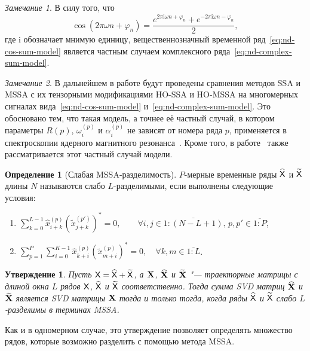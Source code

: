 \documentclass[specialist,
  substylefile=spbu_report.rtx,
subf,href,colorlinks=true, 12pt]{disser}
\theoremstyle{plain}
\newtheorem{statement}{Утверждение}[section]
\theoremstyle{definition}
\newtheorem{definition}{Определение}[section]
\theoremstyle{remark}
\newtheorem{remark}{Замечание}[section]
\newcommand{\iu}{\mathrm{i}}
\begin{document}
\begin{remark}
  В силу того, что
  \[
    \cos(2 \pi \omega n + \varphi_n) =
    \frac{e^{2\pi \iu \omega n + \varphi_n} + e^{-2\pi \iu \omega n -
    \varphi_n}}{2},
  \]
  где $\iu$ обозначает мнимую единицу,
  вещественнозначный временной ряд~\eqref{eq:nd-cos-sum-model} является
  частным случаем комплексного ряда~\eqref{eq:nd-complex-sum-model}.
\end{remark}

\begin{remark}\label{remark:model-justification}
  В дальнейшем в работе будут проведены сравнения методов SSA и MSSA
  с их тензорными модификациями
  HO-SSA и HO-MSSA на многомерных сигналах вида~\eqref{eq:nd-cos-sum-model}
  и~\eqref{eq:nd-complex-sum-model}.
  Это обосновано тем, что такая модель, а точнее её частный случай, в
  котором параметры $R(p)$, $\omega_i^{(p)}$
  и $\alpha_i^{(p)}$ не зависят от номера ряда $p$, применяется в
  спектроскопии ядерного магнитного
  резонанса~\cite{NMR}.
  Кроме того, в работе~\cite{hosvd-hooi-separation} также
  рассматривается этот частный случай модели.
\end{remark}

\begin{definition}[Слабая MSSA-разделимость]
  \label{def:mssa-separability}
  $P$-мерные временные ряды $\widehat{\mathsf{X}}$ и $\widetilde{\mathsf{X}}$ длины
  $N$ называются слабо $L$-разделимыми, если
  выполнены следующие условия:
  \begin{enumerate}
    \item $\displaystyle \sum_{k=0}^{L-1}
      \hat{x}_{i+k}^{(p)}\left(\tilde{x}_{j+k}^{(p')}\right)^* = 0,
      \qquad \forall i, j \in \overline{1:(N-L+1)},\, p, p' \in
      \overline{1:P}$,
    \item $\displaystyle \sum_{p=1}^{P} \sum_{i=0}^{K-1}
      \hat{x}_{k+i}^{(p)} \left(\tilde{x}_{m+i}^{(p)}\right)^* = 0, \quad
      \forall k, m \in \overline{1:L}$.
  \end{enumerate}
\end{definition}

\begin{statement}
  \label{state:mssa-separability}
  Пусть $\mathsf{X} = \widehat{\mathsf{X}} + \widetilde{\mathsf{X}}$, а $\mathbf{X}$,
  $\widehat{\mathbf{X}}$ и $\widetilde{\mathbf{X}}$ "--- траекторные
  матрицы с длиной окна $L$ рядов $\mathsf{X}$, $\widehat{\mathsf{X}}$ и
  $\widetilde{\mathsf{X}}$ соответственно.
  Тогда сумма \emph{SVD} матриц $\widehat{\mathbf{X}}$ и $\widetilde{\mathbf{X}}$
  является \emph{SVD} матрицы $\mathbf{X}$ тогда и только тогда, когда
  ряды $\widehat{\mathsf{X}}$ и $\widetilde{\mathsf{X}}$ слабо $L$-разделимы в
  терминах MSSA.
\end{statement}
Как и в одномерном случае, это утверждение позволяет определять
множество рядов, которые возможно разделить с
помощью метода MSSA.
\end{document}
